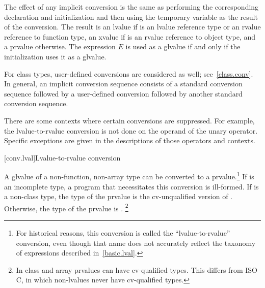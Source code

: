 \pnum
The effect of any implicit
conversion is the same as performing the corresponding declaration and initialization
and then using the temporary variable as the result of the conversion.
The result is an lvalue if  is an lvalue reference
type or an rvalue reference to function type,
an xvalue if  is an rvalue reference to object type,
and a prvalue otherwise. The expression $E$
is used as a glvalue if and only if the initialization uses it as a glvalue.

\pnum
\begin{note}
For class types, user-defined conversions are considered as well;
see~\ref{class.conv}. In general, an implicit conversion
sequence consists of a standard conversion
sequence followed by a user-defined conversion followed by another
standard conversion sequence.
\end{note}

\pnum
\begin{note}
There are some contexts where certain conversions are suppressed. For
example, the lvalue-to-rvalue conversion is not done on the operand of
the unary \tcode{\&} operator. Specific exceptions are given in the
descriptions of those operators and contexts.
\end{note}

[conv.lval]{Lvalue-to-rvalue conversion}

\pnum
{}%
%
A glvalue of a non-function, non-array type 
can be converted to
a prvalue.\footnote{For historical reasons, this conversion is called the ``lvalue-to-rvalue''
conversion, even though that name does not accurately reflect the taxonomy
of expressions described in~\ref{basic.lval}.}
If  is an incomplete type, a
program that necessitates this conversion is ill-formed. If 
is a non-class type, the type of the prvalue is
the cv-unqualified version of . Otherwise, the type of the
prvalue is .%
\footnote{In \Cpp{} class and array prvalues can have cv-qualified types.
This differs from ISO C, in which non-lvalues never have
cv-qualified types.}

